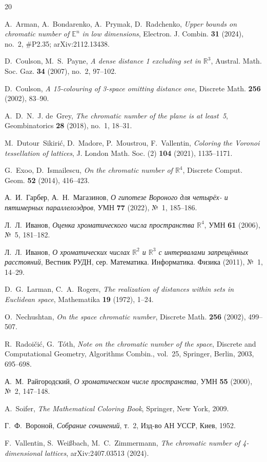 \documentclass[12pt]{article}
\theoremstyle{definition}
\theoremstyle{remark}
\newcommand{\R}{\mathbb{R}}
\newcommand{\E}{\mathbb{E}}
\begin{document}
\begin{thebibliography}{20}

A.~Arman, A.~Bondarenko, A.~Prymak, D.~Radchenko,
\emph{Upper bounds on chromatic number of $\E^n$ in low dimensions},
Electron. J. Combin. \textbf{31} (2024), no.~2, \#P2.35;
arXiv:2112.13438.

D.~Coulson, M.~S.~Payne,
\emph{A dense distance 1 excluding set in $\R^3$},
Austral. Math. Soc. Gaz. \textbf{34} (2007), no.~2, 97--102.

D.~Coulson,
\emph{A 15-colouring of 3-space omitting distance one},
Discrete Math. \textbf{256} (2002), 83--90.

A.~D.~N.~J. de~Grey,
\emph{The chromatic number of the plane is at least~5},
Geombinatorics \textbf{28} (2018), no.~1, 18--31.

M.~Dutour~Sikiri\'c, D.~Madore, P.~Moustrou, F.~Vallentin,
\emph{Coloring the Voronoi tessellation of lattices},
J. London Math. Soc. (2) \textbf{104} (2021), 1135--1171.

G.~Exoo, D.~Ismailescu,
\emph{On the chromatic number of $\R^4$},
Discrete Comput. Geom. \textbf{52} (2014), 416--423.

А.~И.~Гарбер, А.~Н.~Магазинов,
\emph{О гипотезе Вороного для четырёх- и пятимерных параллелоэдров},
УМН \textbf{77} (2022), №~1, 185--186.

Л.~Л.~Иванов,
\emph{Оценка хроматического числа пространства $\R^4$},
УМН \textbf{61} (2006), №~5, 181--182.

Л.~Л.~Иванов,
\emph{О хроматических числах $\R^2$ и $\R^3$ с интервалами запрещённых
расстояний},
Вестник РУДН, сер. Математика. Информатика. Физика (2011), №~1, 14--29.

D.~G.~Larman, C.~A.~Rogers,
\emph{The realization of distances within sets in Euclidean space},
Mathematika \textbf{19} (1972), 1--24.

O.~Nechushtan,
\emph{On the space chromatic number},
Discrete Math. \textbf{256} (2002), 499--507.

R.~Radoi\v{c}i\'c, G.~T\'oth,
\emph{Note on the chromatic number of the space},
Discrete and Computational Geometry, Algorithms Combin., vol.~25,
Springer, Berlin, 2003, 695--698.

А.~М.~Райгородский,
\emph{О хроматическом числе пространства},
УМН \textbf{55} (2000), №~2, 147--148.

A.~Soifer,
\emph{The Mathematical Coloring Book},
Springer, New York, 2009.

Г.~Ф.~Вороной,
\emph{Собрание сочинений}, т.~2,
Изд-во АН УССР, Киев, 1952.

F.~Vallentin, S.~Wei\ss bach, M.~C.~Zimmermann,
\emph{The chromatic number of 4-dimensional lattices},
arXiv:2407.03513 (2024).

\end{thebibliography}
\end{document}
